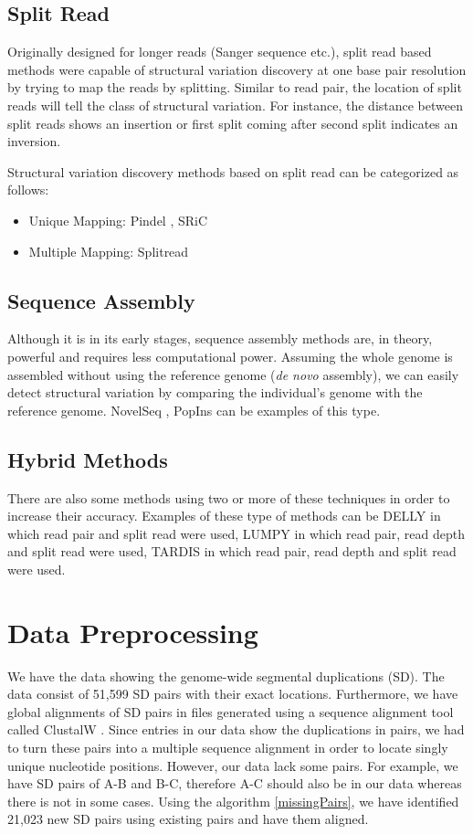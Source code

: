 \subsection{Split Read}
Originally designed for longer reads (Sanger sequence etc.), split read based methods were capable of structural variation discovery at one base pair resolution by trying to map the reads by splitting. Similar to read pair, the location of split reads will tell the class of structural variation. For instance, the distance between split reads shows an insertion or first split coming after second split indicates an inversion.

Structural variation discovery methods based on split read can be categorized as follows:
\begin{itemize}
    \item Unique Mapping: Pindel \cite{ye2009pindel}, SRiC \cite{zhang2011identification}
    \item Multiple Mapping: Splitread \cite{karakoc2012detection}
\end{itemize}

\subsection{Sequence Assembly} 
Although it is in its early stages, sequence assembly methods are, in theory, powerful and requires less computational power. Assuming the whole genome is assembled without using the reference genome (\textit{de novo} assembly), we can easily detect structural variation by comparing the individual's genome with the reference genome. NovelSeq \cite{hajirasouliha2010detection}, PopIns \cite{kehr2015popins} can be examples of this type.

\subsection{Hybrid Methods}
There are also some methods using two or more of these techniques in order to increase their accuracy. Examples of these type of methods can be DELLY \cite{rausch2012delly} in which read pair and split read were used, LUMPY \cite{layer2014lumpy} in which read pair, read depth and split read were used, TARDIS \cite{soylev2017toolkit} in which read pair, read depth and split read were used. 

\section{Data Preprocessing}
We have the data showing the genome-wide segmental duplications (SD). The data consist of 51,599 SD pairs with their exact locations. Furthermore, we have global alignments of SD pairs in files generated using a sequence alignment tool called ClustalW \cite{thompson1994clustal}. Since entries in our data show the duplications in pairs, we had to turn these pairs into a multiple sequence alignment in order to locate singly unique nucleotide positions. However, our data lack some pairs. For example, we have SD pairs of A-B and B-C, therefore A-C should also be in our data whereas there is not in some cases. Using the algorithm \ref{missingPairs}, we have identified 21,023 new SD pairs using existing pairs and have them aligned.

